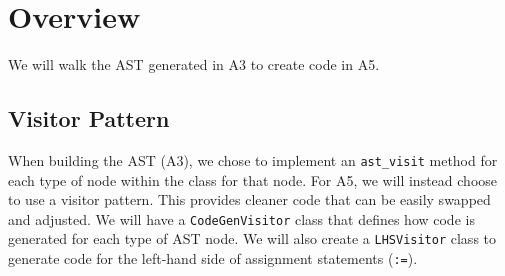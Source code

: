 \section{Overview}
We will walk the AST generated in A3 to create code in A5.

\subsection{Visitor Pattern}
When building the AST (A3), we chose to implement an \texttt{ast\_visit} method
for each type of node within the class for that node. For A5, we will
instead choose to use a visitor pattern. This provides cleaner code that can be
easily swapped and adjusted. We will have a \texttt{CodeGenVisitor} class that
defines how code is generated for each type of AST node. We will also create a
\texttt{LHSVisitor} class to generate code for the left-hand side of assignment
statements (\texttt{:=}).


